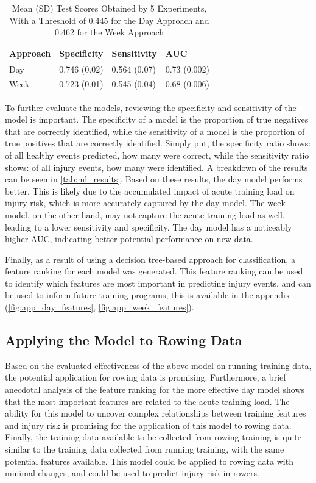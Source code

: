 \begin{table}[hb]
  \centering
  \captionsetup{labelfont=bf,textfont=bf}
  \caption[Runner Injury Prevention Approach Comparison]{Mean (SD) Test Scores Obtained by 5 Experiments, With a Threshold of 0.445 for the Day Approach and 0.462 for the Week Approach}
  \label{tab:ml_results}
  \begin{tabularx}{\textwidth}{@{}l *{3}{Y}@{}}
    \toprule
    \textbf{Approach} & \textbf{Specificity} & \textbf{Sensitivity} & \textbf{AUC} \\ \midrule
    Day & 0.746 (0.02) & 0.564 (0.07) & 0.73 (0.002) \\
    Week & 0.723 (0.01) & 0.545 (0.04) & 0.68 (0.006) \\ \bottomrule
  \end{tabularx}%
\end{table}

To further evaluate the models, reviewing the specificity and sensitivity of the model is important. The specificity of a model is the proportion of true negatives that are correctly identified, while the sensitivity of a model is the proportion of true positives that are correctly identified. Simply put, the specificity ratio shows: of all healthy events predicted, how many were correct, while the sensitivity ratio shows: of all injury events, how many were identified. A breakdown of the results can be seen in \autoref{tab:ml_results}. Based on these results, the day model performs better. This is likely due to the accumulated impact of acute training load on injury risk, which is more accurately captured by the day model. The week model, on the other hand, may not capture the acute training load as well, leading to a lower sensitivity and specificity. The day model has a noticeably higher AUC, indicating better potential performance on new data.

Finally, as a result of using a decision tree-based approach for classification, a feature ranking for each model was generated. This feature ranking can be used to identify which features are most important in predicting injury events, and can be used to inform future training programs, this is available in the appendix (\autoref{fig:app_day_features}, \autoref{fig:app_week_features}).


\subsection{Applying the Model to Rowing Data}
Based on the evaluated effectiveness of the above model on running training data, the potential application for rowing data is promising. Furthermore, a brief anecdotal analysis of the feature ranking for the more effective day model shows that the most important features are related to the acute training load. The ability for this model to uncover complex relationships between training features and injury risk is promising for the application of this model to rowing data. Finally, the training data available to be collected from rowing training is quite similar to the training data collected from running training, with the same potential features available. This model could be applied to rowing data with minimal changes, and could be used to predict injury risk in rowers.